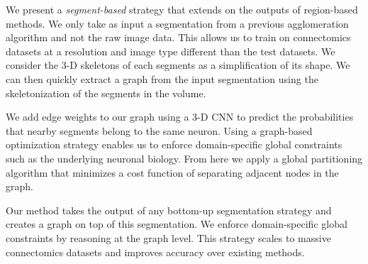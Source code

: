 We present a \textit{segment-based} strategy that extends on the outputs of region-based methods.
We only take as input a segmentation from a previous agglomeration algorithm and not the raw image data. 
This allows us to train on connectomics datasets at a resolution and image type different than the test datasets.
We consider the 3-D skeletons of each segments as a simplification of its shape. 
We can then quickly extract a graph from the input segmentation using the skeletonization of the segments in the volume.

We add edge weights to our graph using a 3-D CNN to predict the probabilities that nearby segments belong to the same neuron.
Using a graph-based optimization strategy enables us to enforce domain-specific global constraints such as the underlying neuronal biology.
From here we apply a global partitioning algorithm that minimizes a cost function of separating adjacent nodes in the graph.

Our method takes the output of any bottom-up segmentation strategy and creates a graph on top of this segmentation. 
We enforce domain-specific global constraints by reasoning at the graph level.
This strategy scales to massive connectomics datasets and improves accuracy over existing methods.

